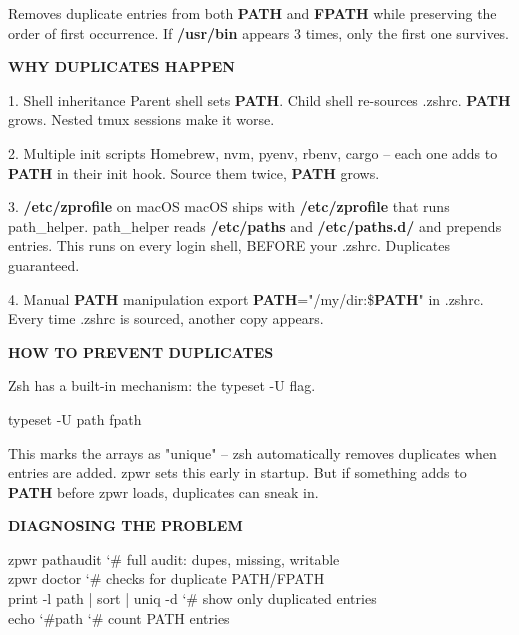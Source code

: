 \documentclass[11pt,a4paper,twoside]{book}
\begin{document}
Removes duplicate entries from both \textbf{PATH} and \textbf{FPATH} while preserving the order of first occurrence. If \textbf{\textbf{/usr/bin}} appears 3 times, only the first one survives.


\vspace{12pt}
{\bfseries\color{neonyellow} WHY DUPLICATES HAPPEN}\vspace{4pt}

1. Shell inheritance Parent shell sets \textbf{PATH}. Child shell re-sources .zshrc. \textbf{PATH} grows. Nested tmux sessions make it worse.

2. Multiple init scripts Homebrew, nvm, pyenv, rbenv, cargo -- each one adds to \textbf{PATH} in their init hook. Source them twice, \textbf{PATH} grows.

3. \textbf{\textbf{/etc/zprofile}} on macOS macOS ships with \textbf{\textbf{/etc/zprofile}} that runs path\_helper. path\_helper reads \textbf{\textbf{/etc/paths}} and \textbf{\textbf{/etc/paths.d/}} and prepends entries. This runs on every login shell, BEFORE your .zshrc. Duplicates guaranteed.

4. Manual \textbf{PATH} manipulation export \textbf{PATH}="/my/dir:\$\textbf{PATH}" in .zshrc. Every time .zshrc is sourced, another copy appears.


\vspace{12pt}
{\bfseries\color{neonyellow} HOW TO PREVENT DUPLICATES}\vspace{4pt}

Zsh has a built-in mechanism: the typeset -U flag.

\begin{codebox}
\color{neongreen}typeset -U path fpath\\
\end{codebox}

This marks the arrays as "unique" -- zsh automatically removes duplicates when entries are added. zpwr sets this early in startup. But if something adds to \textbf{PATH} before zpwr loads, duplicates can sneak in.


\vspace{12pt}
{\bfseries\color{neonyellow} DIAGNOSING THE PROBLEM}\vspace{4pt}

\begin{codebox}
\color{neongreen}zpwr pathaudit                       {\char`\#} full audit: dupes, missing, writable\\
\color{neongreen}zpwr doctor                         {\char`\#} checks for duplicate PATH/FPATH\\
\color{neongreen}print -l path | sort | uniq -d     {\char`\#} show only duplicated entries\\
\color{neongreen}echo {\char`\#}path                         {\char`\#} count PATH entries\\
\end{codebox}
\end{document}
